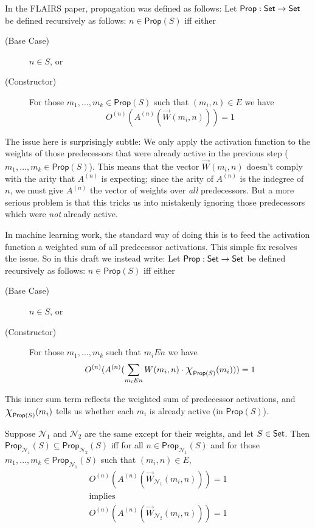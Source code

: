 \documentclass[letterpaper]{article}
\theoremstyle{definition}
\newenvironment{restatedef}[1]
  {\renewcommand\theinnercustomdef{#1}\innercustomdef}
  {\endinnercustomdef}
\newenvironment{restatelemma}[1]
  {\renewcommand\theinnercustomlemma{#1}\innercustomlemma}
  {\endinnercustomlemma}
\newcommand{\Set}{\mbox{\sf Set}}
\newcommand*{\bigchi}{\mbox{\Large$\chi$}}%
\newcommand{\Prop}{\textsf{Prop}}
\newcommand{\Net}{\mathcal{N}}
\begin{document}
In the FLAIRS paper, propagation was defined as follows: 
\begin{restatedef}{3}
    Let $\Prop : \Set \to \Set$ be defined recursively as follows:  $n \in \Prop(S)$ iff either
    \begin{description}
        \item[(Base Case)] $n \in S$, or
        \item[(Constructor)] For those $m_1, \ldots, m_k \in \Prop(S)$ such that $(m_i, n) \in E$ we have
        \[
        O^{(n)}(A^{(n)}(\overrightarrow{W}(m_i, n))) = 1
        \]
    \end{description}
\end{restatedef}
The issue here is surprisingly subtle: We only apply the activation function to the weights of those predecessors that were already active in the previous step ($m_1, \ldots, m_k \in \Prop(S)$). This means that the vector $\overrightarrow{W}(m_i, n)$ doesn't comply with the arity that $A^{(n)}$ is expecting; since the arity of $A^{(n)}$ is the indegree of $n$, we must give $A^{(n)}$ the vector of weights over \emph{all} predecessors. But a more serious problem is that this tricks us into mistakenly ignoring those predecessors which were \emph{not} already active.

In machine learning work, the standard way of doing this is to feed the activation function a weighted sum of all predecessor activations. This simple fix resolves the issue. So in this draft we instead write:
\begin{restatedef}{3}
    Let $\Prop : \Set \to \Set$ be defined recursively as follows:  $n \in \Prop(S)$ iff either
    \begin{description}
        \item[(Base Case)] $n \in S$, or
        \item[(Constructor)] For those $m_1, \ldots, m_k$ such that $m_i{E}n$ we have
        \[
        O^{(n)}(A^{(n)}(\sum_{m_i{E}n} W(m_i, n) \cdot \bigchi_{\Prop(S)}(m_i))) = 1
        \]
    \end{description}
\end{restatedef}
This inner sum term reflects the weighted sum of predecessor activations, and $\bigchi_{\Prop(S)}(m_i)$ tells us whether each $m_i$ is already active (in $\Prop(S)$).


\begin{restatelemma}{2}
    Suppose $\Net_1$ and $\Net_2$ are the same except for their weights, and let $S \in \Set$.  Then ${\Prop_{\Net_1}(S) \subseteq \Prop_{\Net_2}(S)}$ iff for all $n \in \Prop_{\Net_1}(S)$ and for those $m_1, \ldots, m_k \in \Prop_{\Net_1}(S)$ such that $(m_i, n) \in E$,
    \begin{equation}\tag{$\ast\ast$}
      \begin{gathered}
        O^{(n)}(A^{(n)}(\overrightarrow{W}_{\Net_1}(m_i, n))) = 1 \\
        \mbox{implies} \\
        O^{(n)}(A^{(n)}(\overrightarrow{W}_{\Net_2}(m_i, n))) = 1
      \end{gathered}
    \end{equation}
\end{restatelemma}
\end{document}
